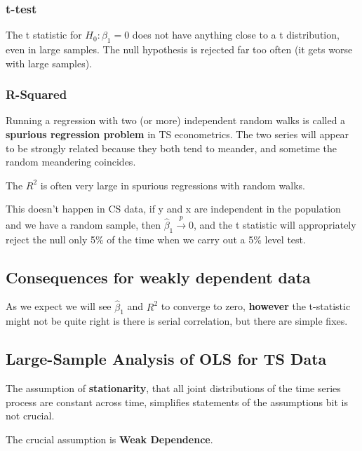\documentclass[11pt]{article}
\begin{document}
\subsubsection{t-test}

The t statistic for $H_0: \beta_1 = 0$ does not have anything close to a t distribution, even in large samples. The null hypothesis is rejected far too often (it gets worse with large samples).

\subsubsection{R-Squared}

Running a regression with two (or more) independent random walks is called a \textbf{spurious regression problem} in TS econometrics. The two series will appear to be strongly related because they both tend to meander, and sometime the random meandering coincides. 

The $R^2$ is often very large in spurious regressions with random walks.

This doesn't happen in CS data, if y and x are independent in the population and we have a random sample, then $\hat{\beta}_1 \xrightarrow{p}0$, and the t statistic will appropriately reject the null only 5\% of the time when we carry out a 5\% level test.

\subsection{Consequences for weakly dependent data}

As we expect we will see $\hat{\beta}_1$ and $R^2$ to converge to zero, \textbf{however} the t-statistic might not be quite right is there is serial correlation, but there are simple fixes.

\subsection{Large-Sample Analysis of OLS for TS Data}

The assumption of \textbf{stationarity}, that all joint distributions of the time series process are constant across time, simplifies statements of the assumptions bit is not crucial.

The crucial assumption is \textbf{Weak Dependence}.
\end{document}

